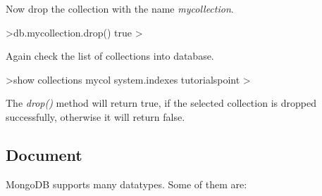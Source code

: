 \documentclass[12pt]{article}
\begin{document}
Now drop the collection with the name \emph{mycollection}.

\begin{bashcode}
>db.mycollection.drop()
true
>
\end{bashcode}

Again check the list of collections into database.

\begin{bashcode}
>show collections
mycol
system.indexes
tutorialspoint
>
\end{bashcode}
The \emph{drop()} method will return true, if the selected collection is
dropped successfully, otherwise it will return false.

\subsection{Document}

MongoDB supports many datatypes. Some of them are: \\
\end{document}
